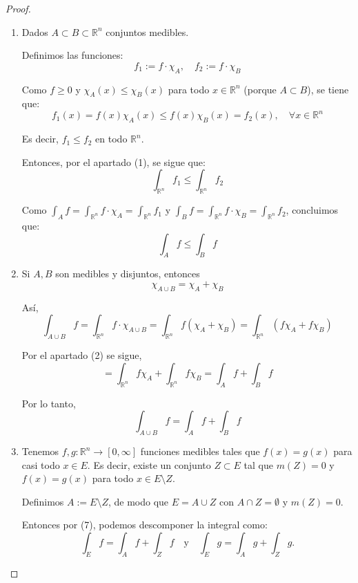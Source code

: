 \begin{proof}
\begin{enumerate}
        \item Dados $A \subset B \subset \mathbb{R}^n$ conjuntos medibles.

              Definimos las funciones:
              \[
                  f_1 := f \cdot \chi_A, \quad f_2 := f \cdot \chi_B
              \]

              Como $f \geq 0$ y $\chi_A(x) \leq \chi_B(x)$ para todo $x \in \mathbb{R}^n$
              (porque $A \subset B$), se tiene que:
              \[
                  f_1(x) = f(x)\chi_A(x) \leq f(x)\chi_B(x) = f_2(x), \quad \forall x \in \mathbb{R}^n
              \]

              Es decir, $f_1 \leq f_2$ en todo $\mathbb{R}^n$.

              Entonces, por el apartado (1), se sigue que:
              \[
                  \int_{\mathbb{R}^n} f_1 \leq \int_{\mathbb{R}^n} f_2
              \]

              Como $\int_A f = \int_{\mathbb{R}^n} f \cdot \chi_A = \int_{\mathbb{R}^n} f_1$
              y $\int_B f = \int_{\mathbb{R}^n} f \cdot \chi_B = \int_{\mathbb{R}^n} f_2$,
              concluimos que:
              \[
                  \int_A f \leq \int_B f
              \]

        \item  Si $A, B$ son medibles y disjuntos, entonces $$ \chi_{A \cup B} = \chi_A +
                  \chi_B $$

              Así, $$ \int_{A \cup B} f = \int_{\mathbb{R}^n} f \cdot \chi_{A \cup B} =
                  \int_{\mathbb{R}^n} f (\chi_A + \chi_B) = \int_{\mathbb{R}^n} (f \chi_A + f
                  \chi_B) $$

              Por el apartado (2) se sigue, $$ = \int_{\mathbb{R}^n} f \chi_A +
                  \int_{\mathbb{R}^n} f \chi_B = \int_A f + \int_B f $$

              Por lo tanto, $$ \int_{A \cup B} f = \int_A f + \int_B f $$

        \item Tenemos $f, g : \mathbb{R}^n \to [0, \infty]$ funciones medibles tales que
              $f(x) = g(x)$ para casi todo $x \in E$. Es decir, existe un conjunto $Z \subset
                  E$ tal que $m(Z) = 0$ y $f(x) = g(x)$ para todo $x \in E \setminus Z$.

              Definimos $A := E \setminus Z$, de modo que $E = A \cup Z$ con $A \cap Z =
                  \emptyset$ y $m(Z) = 0$.

              Entonces por (7), podemos descomponer la integral como:
              \[
                  \int_E f = \int_A f + \int_Z f \quad \text{y} \quad \int_E g = \int_A g + \int_Z g.
              \]


\end{enumerate}
\end{proof}
